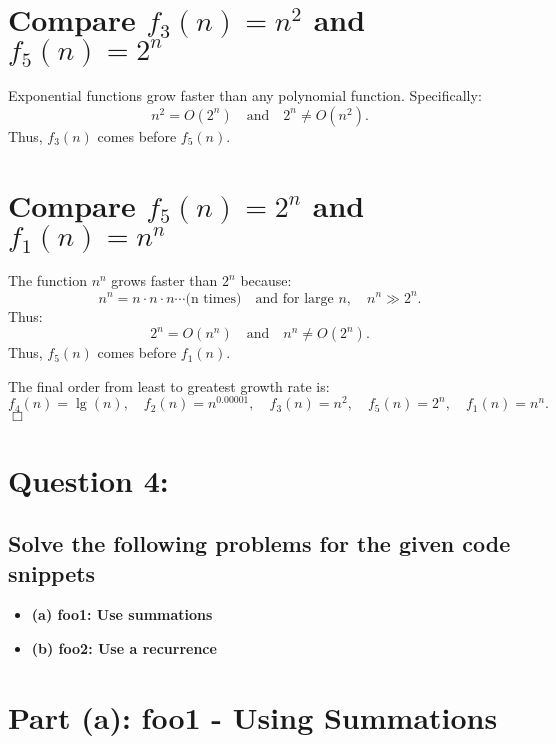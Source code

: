 \documentclass{article}
\begin{document}
\section*{Compare \( f_3(n) = n^2 \) and \( f_5(n) = 2^n \)}  
Exponential functions grow faster than any polynomial function. Specifically:
\[
n^2 = O(2^n) \quad \text{and} \quad 2^n \neq O(n^2).
\]
Thus, \( f_3(n) \) comes before \( f_5(n) \).

\section*{Compare \( f_5(n) = 2^n \) and \( f_1(n) = n^n \)}  
The function \( n^n \) grows faster than \( 2^n \) because:
\[
n^n = n \cdot n \cdot n \cdots \text{(n times)} \quad \text{and for large } n, \quad n^n \gg 2^n.
\]
Thus:
\[
2^n = O(n^n) \quad \text{and} \quad n^n \neq O(2^n).
\]
Thus, \( f_5(n) \) comes before \( f_1(n) \).

The final order from least to greatest growth rate is:
\[
f_4(n) = \lg(n), \quad f_2(n) = n^{0.00001}, \quad f_3(n) = n^2, \quad f_5(n) = 2^n, \quad f_1(n) = n^n.
\]
\(\Box\)

\pagebreak

\section*{Question 4:}
\subsection*{Solve the following problems for the given code snippets}

\begin{itemize}
    \item \textbf{(a) foo1: Use summations}
    \item \textbf{(b) foo2: Use a recurrence}
\end{itemize}

\section*{Part (a): foo1 - Using Summations}

\end{document}
